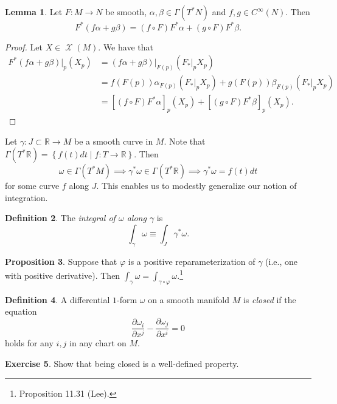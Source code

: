 \documentclass[10pt,letterpaper,cm]{nupset}
\theoremstyle{definition}
\newtheorem{definition}{Definition}[subsection]
\theoremstyle{theorem}
\newtheorem{lemma}[definition]{Lemma}
\newtheorem{prop}[definition]{Proposition}
\newtheorem{exercise}[definition]{Exercise}
\theoremstyle{remark}
\newcommand{\R}{\mathbb R}
\newcommand{\1}{\mathbf{1}}
\newcommand{\0}{\vec 0}
\DeclareMathOperator{\vf}{\mathscr{X}}
\begin{document}
\begin{lemma}
Let $F: M \to N$ be smooth, $\alpha, \beta \in \Gamma(T^{\ast} N)$ and $f, g \in C^{\infty}(N)$. Then $$F^{\ast}(f \alpha + g \beta) = \left(f \circ F\right)F^{\ast} \alpha + (g \circ F)F^{\ast} \beta.$$
\end{lemma}
\begin{proof}
Let $X \in \vf(M)$. We have that
\begin{align*}
F^{\ast}(f \alpha + g\beta)\bigr\rvert_p(X_p) & = \left(f \alpha + g \beta\right)\bigr\rvert_{F(p)}\left(F_{\ast}\bigr\rvert_p X_p\right) 
\\ & = 
f\left(F(p)\right)\alpha_{F(p)}\left(F_{\ast}\bigr\rvert_p  X_p\right)+ g\left(F(p)\right)\beta_{F(p)}\left(F_{\ast}\bigr\rvert_p X_p\right)
\\ &   = \left[(f\circ F)F^{\ast}\alpha\right]_p (X_p) + \left[(g\circ F) F^{\ast}\beta\right]_p(X_p).
\end{align*}
\end{proof}

Let $\gamma : J \subset \R \to M$ be a smooth curve in $M$.  Note that $\Gamma(T^{\ast}\R) = \left\{f(t)dt \mid f : T \to \R\right\}$. Then
$$ \omega \in \Gamma(T^{\ast}M) \implies \gamma^{\ast} \omega \in \Gamma(T^{\ast}\R) \implies \gamma^{\ast}\omega = f(t)dt$$ for some curve $f$ along $J$. This enables us to modestly generalize our notion of integration.

\begin{definition}
The \textit{integral of $\omega$ along $\gamma$} is $$\int_{\gamma} \omega \equiv \int_J \gamma^{\ast}\omega.$$ 
\end{definition}

\begin{prop}
Suppose that $\varphi$ is a positive reparameterization of $\gamma$ (i.e., one with positive derivative). Then $\int_{\gamma} \omega = \int_{\gamma \circ \varphi} \omega$.\footnote{Proposition 11.31 (Lee).}
\end{prop}

\begin{definition}\label{closed}
A differential $1$-form $\omega$ on a smooth manifold $M$ is \textit{closed} if the equation  $$\frac{\partial{\omega_i}}{\partial{x^j}} - \frac{\partial{\omega_j}}{\partial{x^i}} =0$$ holds for any $i,j$ in any chart on $M$.
\end{definition}

\begin{exercise}
Show that being closed is a well-defined property.
\end{exercise}
\end{document}
